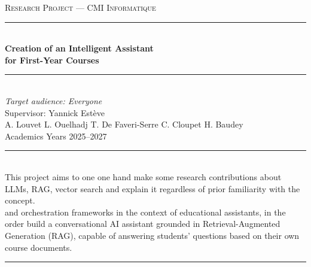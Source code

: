 \documentclass[a4paper,11pt]{article}
\begin{document}
\thispagestyle{empty}

\vspace*{3cm}

\begin{center}
    {\small\scshape Research Project --- CMI Informatique}\\[1cm]
    {\rule{\linewidth}{0.4pt}}\\[0.6cm]
    {\LARGE\bfseries Creation of an Intelligent Assistant\\[0.3cm]for First-Year Courses}\\[0.6cm]
    {\rule{\linewidth}{0.4pt}}\\[1.2cm]
    {\normalsize\itshape Target audience: Everyone}\\[0.4cm]
    {\normalsize Supervisor: Yannick Estève}\\[2.5cm]
    {\normalsize
        A. Louvet \quad L. Ouelhadj \quad T. De Faveri-Serre \quad C. Cloupet \quad H. Baudey
    }\\[0.8cm]
    {\small Academics Years 2025--2027}
\end{center}

\vfill

\begin{center}
\noindent\rule{0.5\linewidth}{0.4pt}\\[0.5cm]
{\small
This project aims to one one hand make  some research contributions about
LLMs, RAG, vector search and explain it regardless of prior familiarity 
with the concept. \\ and orchestration frameworks in the context of 
educational assistants, in the order build a conversational AI assistant grounded in 
Retrieval-Augmented Generation (RAG), capable of answering students'
questions based on their own course documents.
}\\[0.4cm]
\noindent\rule{0.5\linewidth}{0.4pt}
\end{center}

\vspace{2cm}


\newpage
\tableofcontents

\end{document}
